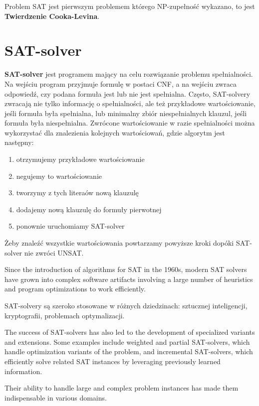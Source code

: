 \documentclass[a4paper,12pt,oneside]{book}
\theoremstyle{definition}
\begin{document}
Problem SAT jest pierwszym problemem którego NP-zupełność wykazano, to jest \textbf{Twierdzenie Cooka-Levina}.

\section{SAT-solver}

\textbf{SAT-solver} jest programem mający na celu rozwiązanie problemu spełnialności. Na wejściu program przyjmuje formulę w postaci CNF, a na wejściu zwraca odpowiedź, czy podana formuła jest lub nie jest spełnialna. Często, SAT-solvery zwracają nie tylko informację o spełnialności, ale też przykładowe wartościowanie, jeśli formuła była spełnialna, lub minimalny zbiór niespełnialnych klauzul, jeśli formuła była niespełnialna. Zwrócone wartościowanie w razie spełnialności można wykorzystać dla znalezienia kolejnych wartościowań, gdzie algorytm jest następny: 

\begin{enumerate}
    \item otrzymujemy przykładowe wartościowanie
    \item negujemy to wartościowanie
    \item tworzymy z tych literaów nową klauzulę 
    \item dodajemy nową klauzulę do formuły pierwotnej
    \item ponownie uruchomiamy SAT-solver
\end{enumerate}

Żeby znaleźć wszystkie wartościowania powtarzamy powyższe kroki dopóki SAT-solver nie zwróci UNSAT.

Since the introduction of algorithms for SAT in the 1960s, modern SAT solvers have grown into complex software artifacts involving a large number of heuristics and program optimizations to work efficiently.

SAT-solvery są szeroko stosowane w różnych dziedzinach: sztucznej inteligencji, kryptografii, problemach optymalizacji.

The success of SAT-solvers has also led to the development of specialized variants and extensions. Some examples include weighted and partial SAT-solvers, which handle optimization variants of the problem, and incremental SAT-solvers, which efficiently solve related SAT instances by leveraging previously learned information.

Their ability to handle large and complex problem instances has made them indispensable in various domains.
\end{document}

